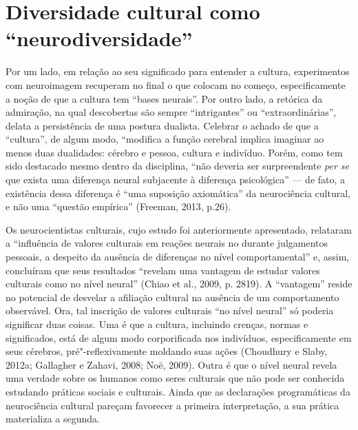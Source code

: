 \chapter{Diversidade cultural como ``neurodiversidade''}

Por um lado, em relação ao seu significado para entender a cultura,
experimentos com neuroimagem recuperam no final o que colocam no começo,
especificamente a noção de que a cultura tem ``bases neurais''. Por
outro lado, a retórica da admiração, na qual descobertas são sempre
``intrigantes'' ou ``extraordinárias'', delata a persistência de uma
postura dualista. Celebrar o achado de que a ``cultura'', de algum modo,
``modifica a função cerebral implica imaginar ao menos duas dualidades:
cérebro e pessoa, cultura e indivíduo. Porém, como tem sido destacado
mesmo dentro da disciplina, ``não deveria ser surpreendente \emph{per
se} que exista uma diferença neural subjacente à diferença psicológica''
--- de fato, a existência dessa diferença é ``uma suposição axiomática''
da neurociência cultural, e não uma ``questão empírica'' (Freeman, 2013,
p.26).

Os neurocientistas culturais, cujo estudo foi anteriormente apresentado,
relataram a ``influência de valores culturais em reações neurais no 
durante julgamentos pessoais, a despeito da ausência de diferenças no
nível comportamental'' e, assim, concluíram que seus resultados
``revelam uma vantagem de estudar valores culturais como  no nível
neural'' (Chiao et al., 2009, p. 2819). A ``vantagem'' reside no
potencial de desvelar a afiliação cultural na ausência de um
comportamento observável. Ora, tal inscrição de valores culturais ``no
nível neural'' só poderia significar duas coisas. Uma é que a cultura,
incluindo crenças, normas e significados, está de algum modo
corporificada nos indivíduos, especificamente em seus cérebros,
pré"-reflexivamente moldando suas ações (Choudhury e Slaby, 2012a;
Gallagher e Zahavi, 2008; Noë, 2009). Outra é que o nível neural revela
uma verdade sobre os humanos como seres culturais que não pode ser
conhecida estudando práticas sociais e culturais. Ainda que as
declarações programáticas da neurociência cultural pareçam favorecer a
primeira interpretação, a sua prática materializa a segunda.

